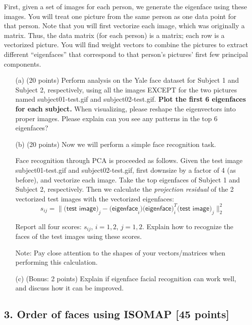 \documentclass[twoside,10pt]{article}
\begin{document}
First, given a set of images for each person, we generate the eigenface using these images. You will treat one picture from the same person as one data point for that person. Note that you will first vectorize each image, which was originally a matrix. Thus, the data matrix (for each person) is a matrix; each row is a vectorized picture. You will find weight vectors to combine the pictures to extract different ``eigenfaces'' that correspond to that person's pictures' first few principal components. 


\begin{enumerate}

\item[(a)] (20 points) Perform analysis on the Yale face dataset for Subject 1 and Subject 2, respectively, using all the images EXCEPT for the two pictures named \textsf{subject01-test.gif} and \textsf{subject02-test.gif}. {\bf Plot the first 6 eigenfaces for each subject.} When visualizing, please reshape the eigenvectors into proper images. Please explain can you see any patterns in the top 6 eigenfaces?

\item[(b)] (20 points) Now we will perform a simple face recognition task. 

Face recognition through PCA is proceeded as follows. Given the test image \textsf{subject01-test.gif} and \textsf{subject02-test.gif}, first downsize by a factor of 4 (as before), and vectorize each image. Take the top eigenfaces of Subject 1 and Subject 2, respectively. Then we calculate the {\it projection residual} of the 2 vectorized test images with the vectorized eigenfaces:
\[s_{ij} = \|\textsf{(test image)}_j - \textsf{(eigenface}_i)\textsf{(eigenface})_i^T \textsf{(test image)}_j\|_2^2\]

Report all four scores: $s_{ij}$, $i = 1, 2$, $j = 1, 2.$ Explain how to recognize the faces of the test images using these scores. 

Note: Pay close attention to the shapes of your vectors/matrices when performing this calculation.

\item[(c)] (Bonus: 2 points) Explain if eigenface facial recognition can work well, and discuss how it can be improved. 

\end{enumerate}

\clearpage

\subsection*{3. Order of faces using ISOMAP [45 points]}
\end{document}

